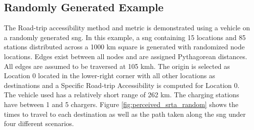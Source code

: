 \documentclass[11pt]{article}
\begin{document}
\begin{multicols}{2}
\subsection*{Randomly Generated Example}

The Road-trip accessibility method and metric is demonstrated using a vehicle on a randomly generated \gls{sng}. In this example, a \gls{sng} containing 15 locations and 85 stations distributed across a 1000 km square is generated with randomized node locations. Edges exist between all nodes and are assigned Pythagorean distances. All edges are assumed to be traversed at 105 kmh. The origin is selected as Location 0 located in the lower-right corner with all other locations as destinations and a Specific Road-trip Accessibility is computed for Location 0. The vehicle used has a relatively short range of 262 km. The charging stations have between 1 and 5 chargers. Figure \ref{fig:perceived_srta_random} shows the times to travel to each destination as well as the path taken along the \gls{sng} under four different scenarios.


\end{multicols}
\end{document}
